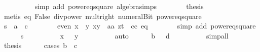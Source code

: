 \begin{isabellebody}
\ \ \ \ \ \ \ \ \isamarkupfalse%
\ {\isacharparenleft}simp\ add{\isacharcolon}\ power{}{\isacharunderscore}eq{\isacharunderscore}square\ algebra{\isacharunderscore}simps{\isacharparenright}\isanewline
\ \ \ \ \ \ \isamarkupfalse%
\ {\isacharquery}thesis\isanewline
\ \ \ \ \ \ \ \ \isamarkupfalse%
\ {\isacharparenleft}metis\ eq{\isacharparenleft}{}{\isacharparenright}\ False\ div{\isacharunderscore}power\ mult{\isacharunderscore}{}{\isacharunderscore}right\ numeral{\isacharunderscore}Bit{}\ power{}{\isacharunderscore}eq{\isacharunderscore}square{\isacharparenright}\isanewline
\ \ \ \ \isamarkupfalse%
\isanewline
\isanewline
\ \ \ \ \isamarkupfalse%
\ {\isachardoublequoteopen}{}{\isacharasterisk}{\isacharquery}s\ {\isacharequal}\ a{\isacharcircum}{}\ {\isacharminus}\ c{\isacharcircum}{}{\isachardoublequoteclose}\isanewline
\ \ \ \ \ \ \isamarkupfalse%
\ {\isacharbackquoteopen}even\ {\isacharparenleft}x\ {\isacharplus}\ y{\isacharparenright}{\isacharbackquoteclose}\ {\isacharbackquoteopen}x{\isacharasterisk}y\ {\isacharequal}\ a{\isacharasterisk}a{\isacharbackquoteclose}\ {\isacharbackquoteopen}z{\isacharasterisk}t\ {\isacharequal}\ c{\isacharasterisk}c{\isacharbackquoteclose}\ eq{\isacharparenleft}{}{\isacharparenright}\isanewline
\ \ \ \ \ \ \isamarkupfalse%
\ {\isacharparenleft}simp\ add{\isacharcolon}\ power{}{\isacharunderscore}eq{\isacharunderscore}square{\isacharparenright}\isanewline
\isanewline
\ \ \ \ \isamarkupfalse%
\ {\isachardoublequoteopen}{\isacharquery}s\ {\isachargreater}\ {}{\isachardoublequoteclose}\isanewline
\ \ \ \ \ \ \isamarkupfalse%
\ {\isacharbackquoteopen}x\ {\isachargreater}\ {}{\isacharbackquoteclose}\ {\isacharbackquoteopen}y\ {\isachargreater}\ {}{\isacharbackquoteclose}\isanewline
\ \ \ \ \ \ \isamarkupfalse%
\ auto\isanewline
\isanewline
\ \ \ \ \isamarkupfalse%
\ {\isachardoublequoteopen}{\isacharquery}b\ {\isasymge}\ {}{\isachardoublequoteclose}\ {\isachardoublequoteopen}{\isacharquery}d\ {\isasymge}\ {}{\isachardoublequoteclose}\isanewline
\ \ \ \ \ \ \isamarkupfalse%
\ simp{\isacharunderscore}all\isanewline
\isanewline
\ \ \ \ \isamarkupfalse%
\ {\isacharquery}thesis\isanewline
\ \ \ \ \isamarkupfalse%
\ {\isacharparenleft}cases\ {\isachardoublequoteopen}{\isacharquery}b\ {\isasymge}\ c{\isachardoublequoteclose}{\isacharparenright}\isanewline

\end{isabellebody}
